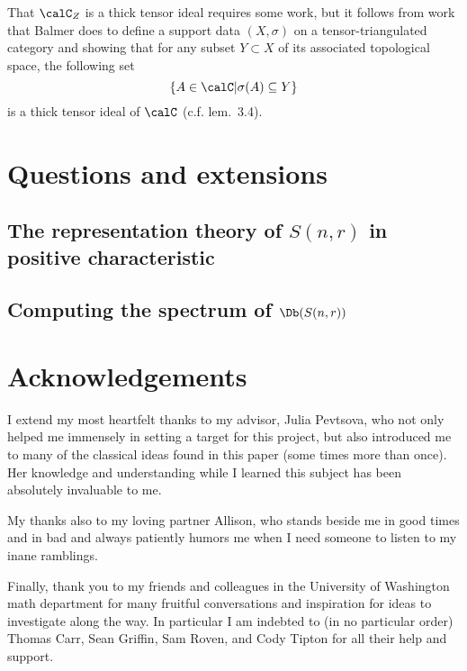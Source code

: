 \documentclass[12pt]{article}
\begin{document}
\begin{rmk}
	That $\calC_Z$ is a thick tensor ideal requires some work, but it follows from work that Balmer does to 
	define a support data $(X,\sigma)$ on a tensor-triangulated category and showing that for any subset $Y\subset X$ of 
	its associated topological space, the following set 
	\[\{A\in\calC|\sigma(A)\subseteq Y\}\]
	is a thick tensor ideal of $\calC$ (c.f. lem.~3.4).
\end{rmk}
\newpage
\section{Questions and extensions}
\subsection*{The representation theory of \texorpdfstring{$S(n,r)$}{S(n,r)} in positive characteristic}

\subsection*{Computing the spectrum of \texorpdfstring{$\Db(S(n,r))$}{DbS(n,r)}}

\newpage
\section*{Acknowledgements}
\label{sec:ack}
I extend my most heartfelt thanks to my advisor, Julia Pevtsova, who not only helped me immensely in setting a target 
for this project, but also introduced me to many of the classical ideas found in this paper (some times more than once). 
Her knowledge and understanding while I learned this subject has been absolutely invaluable to me.

My thanks also to my loving partner Allison, who stands beside me in good times and in bad and always patiently humors me when 
I need someone to listen to my inane ramblings.

Finally, thank you to my friends and colleagues in the University of Washington math department for many fruitful conversations 
and inspiration for ideas to investigate along the way. In particular I am indebted to (in no particular order) Thomas Carr, Sean Griffin, Sam Roven, and Cody Tipton
for all their help and support.

\medskip

\printbibliography
{}
\end{document}
